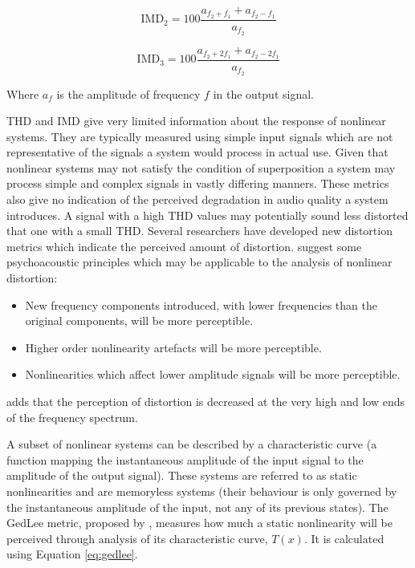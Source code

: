 		\begin{equation}
			\mathrm{IMD}_{2} = 100\frac{a_{f_{2} + f_{1}} + a_{f_{2} - f_{1}}}{a_{f_{2}}}
			\label{eq:imd2}
		\end{equation}

		\begin{equation}
			\mathrm{IMD}_{3} = 100\frac{a_{f_{2} + 2f_{1}} + a_{f_{2} - 2f_{1}}}{a_{f_{2}}}
			\label{eq:imd3}
		\end{equation}

		Where $a_{f}$ is the amplitude of frequency $f$ in the output signal.

		THD and IMD give very limited information about the response of nonlinear systems. They are typically
		measured using simple input signals which are not representative of the signals a system would process in
		actual use. Given that nonlinear systems may not satisfy the condition of superposition a system may process
		simple and complex signals in vastly differing manners. These metrics also give no indication of the
		perceived degradation in audio quality a system introduces. A signal with a high THD values may potentially
		sound less distorted that one with a small THD. Several researchers have developed new distortion metrics
		which indicate the perceived amount of distortion. \citet{geddes2003auditory} suggest some psychoacoustic
		principles which may be applicable to the analysis of nonlinear distortion:

		\begin{itemize}
			\item New frequency components introduced, with lower frequencies than the original components,
				will be more perceptible.
			\item Higher order nonlinearity artefacts will be more perceptible.
			\item Nonlinearities which affect lower amplitude signals will be more perceptible.
		\end{itemize}

		\citet{voishvillo2006assessment} adds that the perception of distortion is decreased at the very high and
		low ends of the frequency spectrum.

		A subset of nonlinear systems can be described by a characteristic curve (a function mapping the
		instantaneous amplitude of the input signal to the amplitude of the output signal). These systems are
		referred to as static nonlinearities and are memoryless systems (their behaviour is only governed by the
		instantaneous amplitude of the input, not any of its previous states). The GedLee metric, proposed by
		\citet{geddes2003auditory}, measures how much a static nonlinearity will be perceived through analysis of
		its characteristic curve, $T(x)$. It is calculated using Equation \ref{eq:gedlee}.

